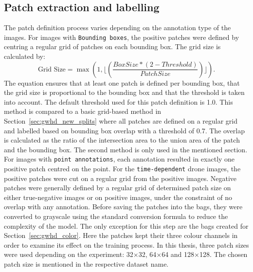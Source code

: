 \documentclass[12pt,parskip = half, DIV=classic,listof=totoc]{scrartcl}
\begin{document}
		\subsection{Patch extraction and labelling}\label{sec:patch_definition}
			The patch definition process varies depending on the annotation type of the images. For images with \texttt{Bounding boxes}, the positive patches
			were defined by centring a regular grid of patches on each bounding box. The grid size is calculated by: 
			\begin{equation}
				\text{Grid Size} = \max(1, \lfloor(\frac{Box Size * (2-Threshold)}{Patch Size})\rfloor).
			\end{equation}
			The equation ensures that at least one patch is defined per bounding box, that the grid size is proportional to the bounding box and 
			that the threshold is taken into account. The default threshold used for this patch definition is 1.0. This method is compared
			to a basic grid-based method in Section~\ref{sec:gwhd_new_splits} where all patches are defined on a regular grid and labelled based on bounding box 
			overlap with a threshold of 0.7. The overlap is calculated as the ratio of the intersection area to the union area of the patch and the bounding box.
			The second method is only used in the mentioned section.
			For images with \texttt{point annotations}, each annotation resulted in exactly one positive patch centred on the point.
			For the \texttt{time-dependent} drone images, the positive patches were cut on a regular grid from the positive images.
			Negative patches were generally defined by a regular grid of determined patch size on either true-negative images or on positive images, under the constraint of 
			no overlap with any annotation. Before saving the patches into the bags, they were converted to grayscale using the standard conversion formula to 
			reduce the complexity of the model. The only exception for this step are the bags created for Section~\ref{sec:gwhd_color}. Here the
			patches kept their three colour channels in order to examine its effect on the training process. In this thesis, three patch sizes were used depending on the experiment: 32$\times$32, 64$\times$64 and 128$\times$128.
			The chosen patch size is mentioned in the respective dataset name.

\end{document}

